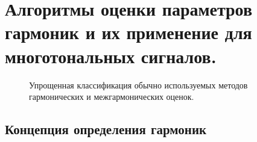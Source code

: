 
%




%
\chapter{ Алгоритмы оценки параметров гармоник и их применение для многотональных сигналов.}\label{ch:ch1}


\begin{figure}[ht]
	\caption{Упрощенная классификация обычно используемых методов гармонических и межгармонических оценок.}\label{fig:picture8}
\end{figure}


\section{Концепция определения гармоник} \label{sec:ch1/sec1}

